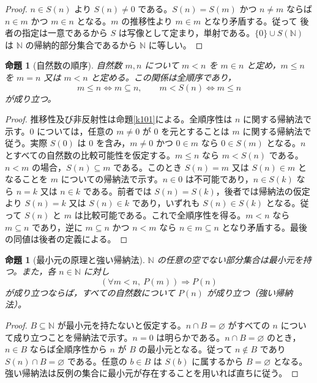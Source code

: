 \documentclass[a5paper,10pt,dvipdfmx]{jsarticle}
\theoremstyle{definition}
\theoremstyle{plain}
\newtheorem{prop}[ruledef]{命題}
\newcommand{\iffc}{\Longleftrightarrow}
\newcommand{\impc}{\Longrightarrow}
\begin{document}
\begin{proof}
$n\in S(n)$ より $S(n)\ne0$ である。$S(n)=S(m)$ かつ $n\ne m$ ならば $n\in m$ かつ $m\in n$ となる。$m$ の推移性より $m\in m$ となり矛盾する。従って 後者の指定は一意であるから $S$ は写像として定まり，単射である。$\{0\}\cup S(\mathbb N)$ は $\mathbb N$ の帰納的部分集合であるから $\mathbb N$ に等しい。
\end{proof}
\begin{prop}[自然数の順序]\label{k103}
自然数 $m,n$ について $m<n$ を $m\in n$ と定め，$m\leq n$ を $m=n$ 又は $m<n$ と定める。この関係は全順序であり，
\[ m\leq n\iffc m\subseteq n,\qquad m<S(n)\iffc m\leq n \]
が成り立つ。
\end{prop}
\begin{proof}
推移性及び非反射性は命題\ref{k101}による。全順序性は $n$ に関する帰納法で示す。$0$ については，任意の $m\ne0$ が $0$ を元とすることは $m$ に関する帰納法で従う。実際 $S(0)$ は $0$ を含み，$m\ne0$ かつ $0\in m$ なら $0\in S(m)$ となる。$n$ とすべての自然数の比較可能性を仮定する。$m\leq n$ なら $m<S(n)$ である。$n<m$ の場合，$S(n)\subseteq m$ である。このとき $S(n)=m$ 又は $S(n)\in m$ となることを $m$ についての帰納法で示す。$n\in0$ は不可能であり，$n\in S(k)$ なら $n=k$ 又は $n\in k$ である。前者では $S(n)=S(k)$，後者では帰納法の仮定より $S(n)=k$ 又は $S(n)\in k$ であり，いずれも $S(n)\in S(k)$ となる。従って $S(n)$ と $m$ は比較可能である。これで全順序性を得る。$m<n$ なら $m\subseteq n$ であり，逆に $m\subseteq n$ かつ $n<m$ なら $n\in m\subseteq n$ となり矛盾する。最後の同値は後者の定義による。
\end{proof}
\begin{prop}[最小元の原理と強い帰納法]\label{k104}
$\mathbb N$ の任意の空でない部分集合は最小元を持つ。また，各 $n\in\mathbb N$ に対し
\[ (\forall m<n,\ P(m))\impc P(n) \]
が成り立つならば，すべての自然数について $P(n)$ が成り立つ（強い帰納法）。
\end{prop}
\begin{proof}
$B\subseteq\mathbb N$ が最小元を持たないと仮定する。$n\cap B=\varnothing$ がすべての $n$ について成り立つことを帰納法で示す。$n=0$ は明らかである。$n\cap B=\varnothing$ のとき，$n\in B$ ならば全順序性から $n$ が $B$ の最小元となる。従って $n\notin B$ であり $S(n)\cap B=\varnothing$ である。任意の $b\in B$ は $S(b)$ に属するから $B=\varnothing$ となる。強い帰納法は反例の集合に最小元が存在することを用いれば直ちに従う。
\end{proof}
\end{document}
